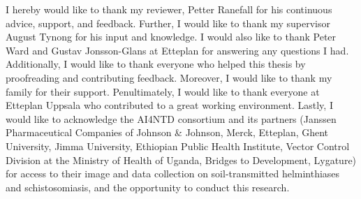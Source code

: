 \begin{acknowledgements}
    I hereby would like to thank my reviewer, Petter Ranefall for his continuous advice, support, and feedback. Further, I would like to thank my supervisor August Tynong for his input and knowledge. I would also like to thank Peter Ward and Gustav Jonsson-Glans at Etteplan for answering any questions I had. Additionally, I would like to thank everyone who helped this thesis by proofreading and contributing feedback. Moreover, I would like to thank my family for their support. Penultimately, I would like to thank everyone at Etteplan Uppsala who contributed to a great working environment. Lastly, I would like to acknowledge the AI4NTD consortium and its partners (Janssen Pharmaceutical Companies of Johnson \& Johnson, Merck, Etteplan, Ghent University, Jimma University, Ethiopian Public Health Institute, Vector Control Division at the Ministry of Health of Uganda, Bridges to Development, Lygature) for access to their image and data collection on soil-transmitted helminthiases and schistosomiasis, and the opportunity to conduct this research.
\end{acknowledgements}
  

